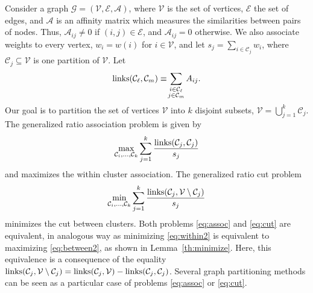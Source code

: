\documentclass[10pt,journal,compsoc]{IEEEtran}
\newcommand\C{{\mathcal{C}}}
\begin{document}
Consider a graph $\mathcal{G} = (\mathcal{V}, \mathcal{E}, \mathcal{A})$,
where $\mathcal{V}$ is the set of vertices, $\mathcal{E}$ the set of edges,
and $\mathcal{A}$ is an affinity matrix  
which measures the 
similarities between pairs of nodes. Thus, $\mathcal{A}_{ij} \ne 0$
if $(i,j) \in \mathcal{E}$, and $\mathcal{A}_{ij} = 0$ otherwise.
We also associate weights to every vertex, 
$w_i = w(i)$ for $i \in \mathcal{V}$, and let $s_j = \sum_{ i \in \C_j} w_i$,
where $\C_j \subseteq \mathcal{V}$ is one partition of $\mathcal{V}$.
Let
\begin{equation}
\textnormal{links}(\C_\ell, \C_m) \equiv  
\!\sum_{\substack{i\in \C_\ell\\ j\in \C_m} } A_{ij} .
\end{equation}
Our goal is to partition the set of vertices $\mathcal{V}$ into $k$ disjoint
subsets, $\mathcal{V} = \bigcup_{j=1}^k \C_j $. 
The generalized ratio association problem is given by
\begin{equation}
\label{eq:assoc}
\max_{\C_i,\dots,\C_k} \sum_{j=1}^k \dfrac{\textnormal{links}(\C_j,\C_j)}{s_j}
\end{equation}
and maximizes the within cluster association.
The generalized ratio cut problem
\begin{equation}
\label{eq:cut}
\min_{\C_i,\dots,\C_k} \sum_{j=1}^k
\dfrac{\textnormal{links}(\C_j,\mathcal{V} \setminus \C_j)}{s_j}
\end{equation}
minimizes the cut between clusters. Both problems \eqref{eq:assoc}  and
\eqref{eq:cut} are equivalent,
in analogous way as minimizing \eqref{eq:within2} is equivalent to
maximizing \eqref{eq:between2}, as shown in Lemma~\ref{th:minimize}.
Here, this equivalence is  a consequence of the equality
$\textnormal{links}(\C_j,\mathcal{V} \setminus  \C_j)=
\textnormal{links}(\C_j,\mathcal{V}) - \textnormal{links}(\C_j,\C_j)$.
Several graph partitioning methods 
\cite{Kernighan,Malik,Chan,Yu}
can be seen as a particular case of problems
\eqref{eq:assoc} or \eqref{eq:cut}.
\end{document}
